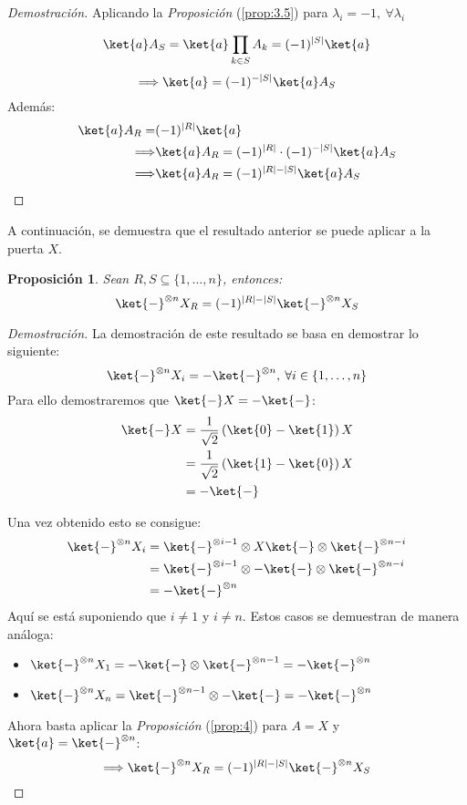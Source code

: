 \documentclass[10pt,conference,a4paper]{IEEEtran}
\newtheorem{prop}{Proposición}[section]
\providecommand{\abs}[1]{\lvert#1\rvert}
\begin{document}
\begin{proof}[Demostración] 
    Aplicando la \textit{Proposición} (\ref{prop:3.5}) para $\lambda_i=-1,\ \forall \lambda_i$
        
    $$\ket{a}A_S=\ket{a}\displaystyle\prod_{k\in S}A_k=(-1)^{\abs{S}}\ket{a}$$
    $$\Longrightarrow \ket{a}=(-1)^{-\abs{S}}\ket{a}A_S$$
    Además: 
    \begin{align*}
    \ket{a}A_R =& (-1)^{\abs{R}}\ket{a}\\
    \Longrightarrow&\ket{a}A_R=(-1)^{\abs{R}}\cdot(-1)^{-\abs{S}}\ket{a}A_S\\
    \Longrightarrow &\ket{a}A_R=(-1)^{\abs{R}-\abs{S}}\ket{a}A_S
\end{align*}
    \end{proof}
\vspace{1mm}
A continuación, se demuestra que el resultado anterior se puede aplicar a la puerta $X$.
\vspace{1mm}
\begin{prop}
    Sean $R, S\subseteq \{1,\ldots, n\}$, entonces:
    \begin{equation}
       \ket{-}^{\otimes n} X_R=(-1)^{\abs{R}-\abs{S}}\ket{-}^{\otimes n}X_S
    \end{equation}
    \label{prop:5} 
\end{prop}
\begin{proof}[Demostración] 
    La demostración de este resultado se basa en demostrar lo siguiente:
    $$ \ket{-}^{\otimes n} X_i =  -\ket{-}^{\otimes n},\:\forall i\in \{1,\ldots, n\}$$
    Para ello demostraremos que $\ket{-}X=-\ket{-}$:
    \begin{align*}
        \ket{-}X&=\dfrac{1}{\sqrt{2}}\left(\ket{0}-\ket{1}\right)X\\
        &=\dfrac{1}{\sqrt{2}}\left(\ket{1}-\ket{0}\right)X\\
        &=-\ket{-}
    \end{align*}
    
Una vez obtenido esto se consigue:
\begin{align*}
    \ket{-}^{\otimes n}X_i&=\ket{-}^{\otimes i-1}\otimes X\ket{-}\otimes\ket{-}^{\otimes n-i}\\
    &=\ket{-}^{\otimes i-1}\otimes -\ket{-}\otimes\ket{-}^{\otimes n-i}\\
    &=-\ket{-}^{\otimes n}
\end{align*}
Aquí se está suponiendo que $i\neq 1$ y $i\neq n$. Estos casos se demuestran de manera análoga:
\vspace{1mm}
\begin{itemize}
    \item $\ket{-}^{\otimes n}X_1=-\ket{-}\otimes\ket{-}^{\otimes n-1}=-\ket{-}^{\otimes n}$
    \vspace{1mm}
    \item $\ket{-}^{\otimes n}X_n=\ket{-}^{\otimes n-1}\otimes-\ket{-}=-\ket{-}^{\otimes n}$
\end{itemize}
\vspace{1mm}
Ahora basta aplicar la \textit{Proposición} (\ref{prop:4}) para $A=X$ y \\
$\ket{a}=\ket{-}^{\otimes n}$:
$$\Longrightarrow  \ket{-}^{\otimes n} X_R=(-1)^{\abs{R}-\abs{S}}\ket{-}^{\otimes n}X_S$$
\end{proof}
\end{document}
